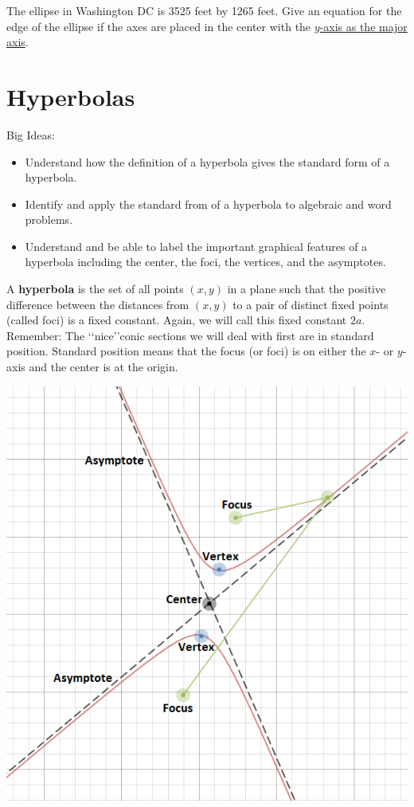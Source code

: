 \question The ellipse in Washington DC is 3525 feet by 1265 feet. Give an equation for the edge of the ellipse if the axes are placed in the center with the \underline{$y$-axis as the major axis}.

\section{Hyperbolas}
Big Ideas:
\begin{itemize}
\item Understand how the definition of a hyperbola gives the standard form of a hyperbola.
\item Identify and apply the standard from of a hyperbola to algebraic and word problems.
\item Understand and be able to label the important graphical features of a hyperbola including the center, the foci, the vertices, and the asymptotes.
\end{itemize}

\begin{info} A \textbf{hyperbola} is the set of all points $(x,y)$ in a plane such that the positive difference  between the distances from $(x,y)$ to a pair of distinct fixed points (called foci) is a fixed constant. Again, we will call this fixed constant $2a$.
Remember:  The \lq\lq nice\rq\rq conic sections we will deal with first are in standard position.
Standard position means that the focus (or foci) is on either the $x$- or $y$-axis and the center is at the origin.
\end{info}
\begin{center} \includegraphics[scale=.5]{generalhyperbola2.png} \end{center}


